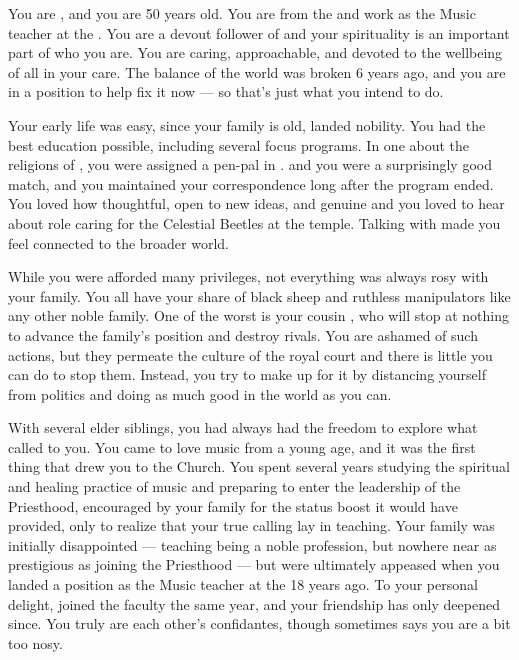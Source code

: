 \documentclass[char]{GL2020}
\begin{document}
\name{\cMusic{}}

You are \cMusic{\intro}, and you are 50 years old. You are from the \pFarm{} and work as the Music teacher at the \pSchool{}. You are a devout follower of \cFarmGod{\intro} and your spirituality is an important part of who you are. You are caring, approachable, and devoted to the wellbeing of all in your care. The balance of the world was broken 6 years ago, and you are in a position to help fix it now — so that's just what you intend to do.

Your early life was easy, since your family is old, landed nobility. You had the best education possible, including several focus programs. In one about the religions of \pEarth{}, you were assigned a pen-pal in \pTech{}. \cBeetle{\intro} and you were a surprisingly good match, and you maintained your correspondence long after the program ended. You loved how thoughtful, open to new ideas, and genuine \cBeetle{\theywere} and you loved to hear about \cBeetle{\their} role caring for the Celestial Beetles at the temple. Talking with \cBeetle{\them} made you feel connected to the broader world. 

While you were afforded many privileges, not everything was always rosy with your family. You all have your share of black sheep and ruthless manipulators like any other noble family. One of the worst is your cousin \cEvilNemesis{\intro}, who will stop at nothing to advance the family's position and destroy rivals. You are ashamed of such actions, but they permeate the culture of the royal court and there is little you can do to stop them. Instead, you try to make up for it by distancing yourself from \pFarm{} politics and doing as much good in the world as you can. 

With several elder siblings, you had always had the freedom to explore what called to you. You came to love music from a young age, and it was the first thing that drew you to the Church. You spent several years studying the spiritual and healing practice of music and preparing to enter the leadership of the Priesthood, encouraged by your family for the status boost it would have provided, only to realize that your true calling lay in teaching. Your family was initially disappointed — teaching being a noble profession, but nowhere near as prestigious as joining the Priesthood — but were ultimately appeased when you landed a position as the Music teacher at the \pSchool{} 18 years ago. To your personal delight, \cBeetle{} joined the faculty the same year, and your friendship has only deepened since. You truly are each other’s confidantes, though sometimes \cBeetle{}says you are a bit too nosy. 
\end{document}
